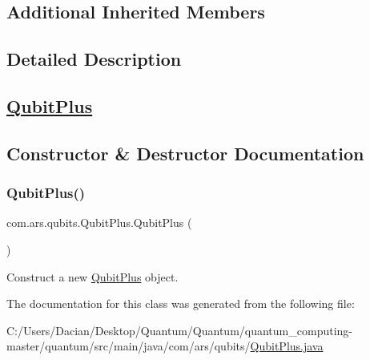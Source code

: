 \subsection*{Additional Inherited Members}


\subsection{Detailed Description}
\subsection*{\hyperlink{classcom_1_1ars_1_1qubits_1_1_qubit_plus}{Qubit\+Plus}}

\subsection{Constructor \& Destructor Documentation}
\hypertarget{classcom_1_1ars_1_1qubits_1_1_qubit_plus_a094f90aed7126ad716207496299e08dc}{}\label{classcom_1_1ars_1_1qubits_1_1_qubit_plus_a094f90aed7126ad716207496299e08dc} 
\subsubsection{\texorpdfstring{Qubit\+Plus()}{QubitPlus()}}
{\footnotesize\ttfamily com.\+ars.\+qubits.\+Qubit\+Plus.\+Qubit\+Plus (\begin{DoxyParamCaption}{ }\end{DoxyParamCaption})}

Construct a new {\ttfamily  \hyperlink{classcom_1_1ars_1_1qubits_1_1_qubit_plus}{Qubit\+Plus}} object. 

The documentation for this class was generated from the following file\+:\begin{DoxyCompactItemize}
\item 
C\+:/\+Users/\+Dacian/\+Desktop/\+Quantum/\+Quantum/quantum\+\_\+computing-\/master/quantum/src/main/java/com/ars/qubits/\hyperlink{_qubit_plus_8java}{Qubit\+Plus.\+java}\end{DoxyCompactItemize}
